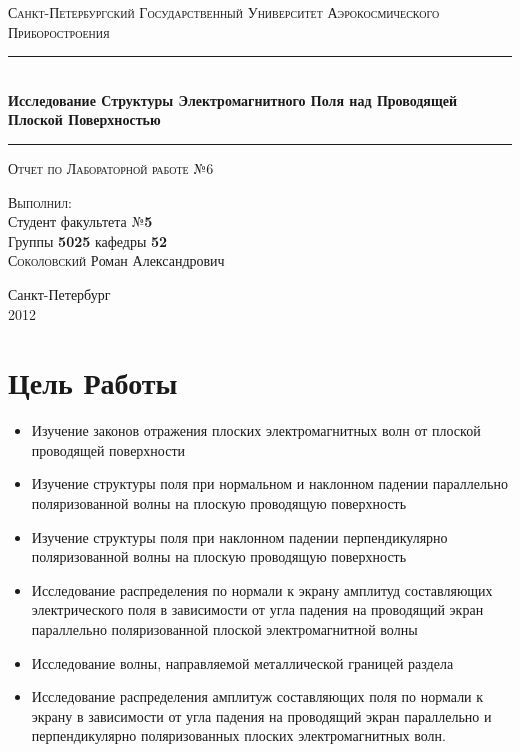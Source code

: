 \documentclass[11pt,a4paper,oneside, reqno]{amsproc}
\author{Соколовский Роман}
\begin{document}
\begin{titlepage}
    \begin{center}
        \textsc{\large Санкт-Петербургский Государственный Университет Аэрокосмического Приборостроения}\\[5cm]
        \rule{\textwidth}{1pt}\\
        \vspace{10pt}
        { \huge \bfseries Исследование Структуры Электромагнитного Поля 
        над Проводящей Плоской Поверхностью}\\[0.4cm]
        \hrule
        \vspace{0.4cm}
        \textsc{ {\large Отчет по Лабораторной работе №6}}
        
        \vspace{2.5cm}
        \begin{flushright}
        \begin{minipage}{0.5\textwidth}
            \begin{flushright} 
                \textsc{\small Выполнил}:\\
                \large
                Студент факультета №\textbf{5}\\
                Группы \textbf{5025} кафедры \textbf{52}\\[2pt]
                \textsc{Соколовский} \textsc{Р}оман \textsc{А}лександрович
            \end{flushright}
        \end{minipage}
        \end{flushright}
        \vfill
        {\large Санкт-Петербург\\2012}
    \end{center}
\end{titlepage}

\section{Цель Работы}
\begin{itemize}
    \item Изучение законов отражения плоских электромагнитных волн от плоской проводящей
        поверхности
    \item Изучение структуры поля при нормальном и наклонном падении параллельно
        поляризованной волны на плоскую проводящую поверхность
    \item Изучение структуры поля при наклонном падении перпендикулярно поляризованной волны
        на плоскую проводящую поверхность
    \item Исследование распределения по нормали к экрану амплитуд составляющих электрического
        поля в зависимости от угла падения на проводящий экран параллельно поляризованной
        плоской электромагнитной волны
    \item Исследование волны, направляемой металлической границей раздела
    \item Исследование распределения амплитуж составляющих поля по нормали к экрану в
        зависимости от угла падения на проводящий экран параллельно и перпендикулярно
        поляризованных плоских электромагнитных волн.\\
\end{itemize}
\end{document}
